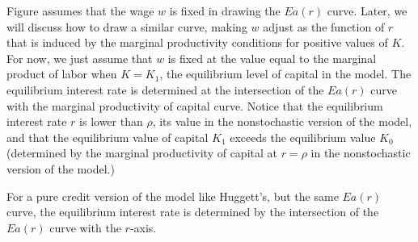 %


\smallskip

  Figure  assumes that the wage $w$ is fixed in drawing the $E a(r)$
curve.  Later, we will discuss how to draw a similar curve, making $w$
adjust as the function of $r$ that is induced by the marginal
productivity conditions for positive values of $K$. For now, we just assume
that $w$ is fixed at the value equal to the marginal product of labor
when $K = K_1$, the equilibrium level of capital in the model.  The
equilibrium interest rate is determined at the intersection of the
$E a(r)$ curve with the marginal productivity of capital curve.
Notice that the equilibrium interest rate $r$ is lower than $\rho$, its
value in the nonstochastic version of the model, and that the equilibrium
value of capital $K_1$ exceeds the equilibrium value $K_0$ (determined by
the marginal productivity of capital at $r=\rho$ in the nonstochastic version
of the model.)

  For a pure credit version of the model like Huggett's, but the same $E a(r)$
curve, the  equilibrium interest rate is determined by the intersection of
the $E a(r)$ curve with the $r$-axis.

